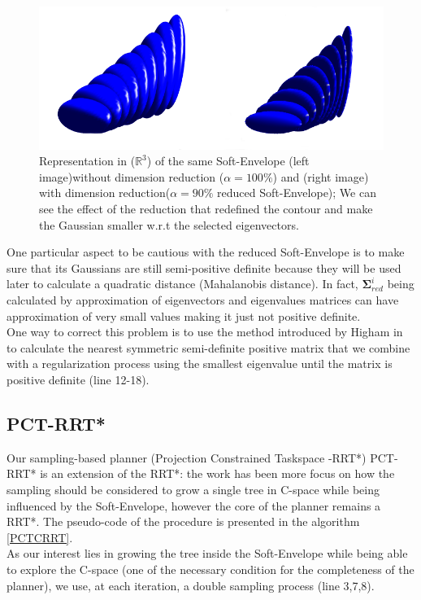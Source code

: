 \documentclass[letterpaper, 10 pt, conference]{ieeeconf}  %
\newcommand{\mb}[1]{{\boldsymbol{#1}}}
\begin{document}
\begin{figure}[h]
	\centering
	\includegraphics[scale=0.35]{figure/100vs90EnvOnly.png}
		\caption{Representation in ($\mathbb{R}^{3}$) of the same Soft-Envelope (left image)without dimension reduction ($\alpha = 100 \%$) and (right image) with dimension reduction($\alpha = 90\%$ reduced Soft-Envelope); We can see the effect of the reduction that redefined the contour and make the Gaussian smaller w.r.t the selected eigenvectors.}
	\label{100vs90EnvOnly}
\end{figure}

One particular aspect to be cautious with the reduced Soft-Envelope is to make sure that its Gaussians are still semi-positive definite because they will be used later to calculate a quadratic distance (Mahalanobis distance). In fact, $\mb{\Sigma}_{red}^{i}$ being calculated by approximation of eigenvectors and eigenvalues matrices can have approximation of very small values making it just not positive definite.\\ One way to correct this problem is to use the method introduced by Higham in \cite{Nearest_PSDMATRIX} to calculate the nearest symmetric semi-definite positive matrix that we combine with a regularization process using the smallest eigenvalue until the matrix is positive definite (line 12-18).

\subsection{PCT-RRT*} \label{PCT-RRT*}
Our sampling-based planner (Projection Constrained Taskspace -RRT*) PCT-RRT* is an extension of the RRT*: the work has been more focus on how the sampling should be considered to grow a single tree in C-space while being influenced by the Soft-Envelope, however the core of the planner remains a RRT*. The pseudo-code of the procedure is presented in the algorithm \ref{PCTCRRT}.\\
As our interest lies in growing the tree inside the Soft-Envelope while being able to explore the C-space (one of the necessary condition for the completeness of the planner), we use, at each iteration, a double sampling process (line 3,7,8). \\
\end{document}
